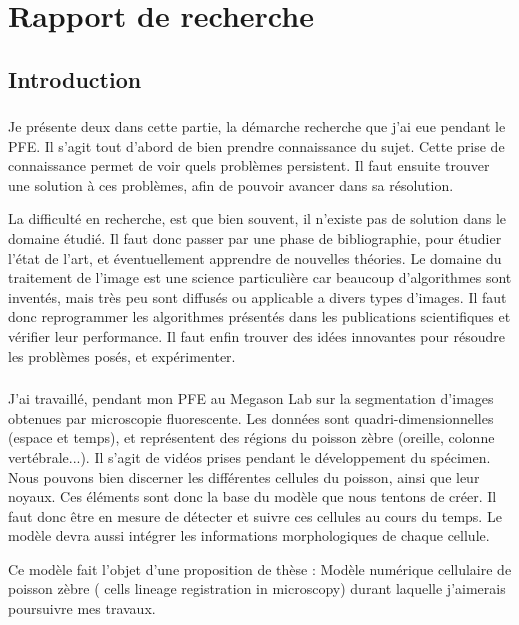 

\chapter{Rapport de recherche} 

\section*{Introduction}

\subsection*{}
Je présente deux dans cette partie, la démarche recherche que j'ai eue pendant le PFE. Il s'agit tout d'abord de bien prendre connaissance du sujet. Cette prise de connaissance permet de voir quels problèmes persistent. Il faut ensuite trouver une solution à ces problèmes, afin de pouvoir avancer dans sa résolution.

La difficulté en recherche, est que bien souvent, il n'existe pas de solution dans le domaine étudié.
Il faut donc passer par une phase de bibliographie, pour étudier l'état de l'art,
et éventuellement apprendre de nouvelles théories.
Le domaine du traitement de l'image est une science particulière car beaucoup d'algorithmes sont inventés,
mais très peu sont diffusés ou applicable a divers types d'images.
Il faut donc reprogrammer les algorithmes présentés dans les publications scientifiques et vérifier leur performance.
Il faut enfin trouver des idées innovantes pour résoudre les problèmes posés, et expérimenter.

\subsection*{}
J'ai travaillé, pendant mon PFE au Megason Lab sur la segmentation d'images obtenues par microscopie fluorescente.
Les données sont quadri-dimensionnelles (espace et temps), et représentent des régions du poisson zèbre (oreille, colonne vertébrale...). Il s'agit de vidéos prises pendant le développement du spécimen. Nous pouvons bien discerner les différentes cellules du poisson, ainsi que leur noyaux. Ces éléments sont donc la base du modèle que nous tentons de créer. Il faut donc être en mesure de détecter et suivre ces cellules au cours du temps. Le modèle devra aussi intégrer les informations morphologiques de chaque cellule.

Ce modèle fait l'objet d'une proposition de thèse : Modèle numérique cellulaire de poisson zèbre ( cells lineage registration in microscopy) durant laquelle j'aimerais poursuivre mes travaux.

